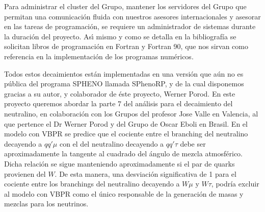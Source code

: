 \begin{ideas}
Para administrar el cluster del Grupo, mantener los servidores del
Grupo que permitan una comunicación fluida con nuestros asesores
internacionales y asesorar en las tareas de programación, se requiere
un administrador de sistemas durante la duración del proyecto. As\'\i{}
mismo y como se detalla en la bibliografía se solicitan libros de
programación en Fortran y Fortran 90, que nos sirvan como referencia
en la implementación de los programas numéricos.


Todos estos decaimientos están implementadas en una versión que aún no
es pública del programa SPHENO %
llamada
SPhenoRP, y de la cual disponemos gracias a su autor, y colaborador de
éste proyecto, Werner Porod. En este proyecto queremos abordar la
parte 7 del análisis para el decaimiento del neutralino, en
colaboración con los Grupos del profesor Jose Valle en Valencia, al
que pertence el Dr Werner Porod y del Grupo de Oscar Eboli en Brasil.
En el modelo con VBPR se predice que el cociente entre el branching
del neutralino decayendo a $qq'\mu$ con el del neutralino decayendo a
$qq'\tau$ debe ser aproximadamente la tangente al cuadrado del ángulo de
mezcla atmosférico. Dicha relación se sigue manteniendo
aproximadamente si el par de quarks provienen del $W$. De
esta manera, una desviación significativa de 1 para el cociente entre
los branchings del neutralino decayendo a $W\mu$ y $W\tau$, podría
excluir al modelo con VBPR como el único responsable de la generación
de masas y mezclas para los neutrinos.


\end{ideas}
